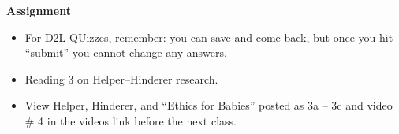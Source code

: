  {\bf Assignment}
 \begin{itemize}
 \item %
   For D2L QUizzes, remember: you can save and come
   back, but once you hit ``submit'' you cannot change any answers.
 \item Reading 3 on Helper--Hinderer research. 
 \item View Helper, Hinderer, and ``Ethics for Babies'' posted as 3a --
   3c  and video \# 4 in the videos link before  the next class.
 \end{itemize}


